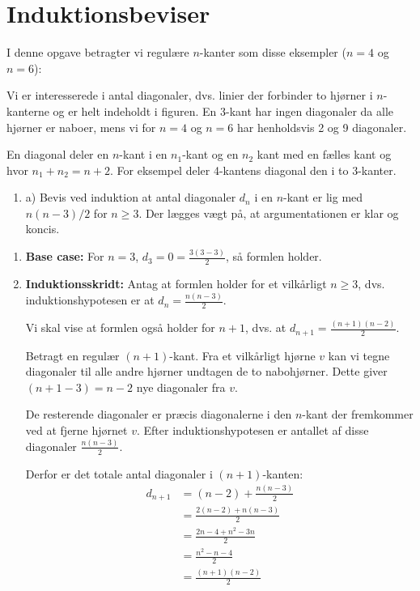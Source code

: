 \documentclass{article}
\theoremstyle{definition}
\begin{document}
\section{Induktionsbeviser}
I denne opgave betragter vi regulære $n$-kanter som disse eksempler ($n = 4$ og $n = 6$):

Vi er interesserede i antal diagonaler, dvs. linier der forbinder to hjørner i $n$-kanterne og er helt indeholdt i figuren. En 3-kant har ingen diagonaler da alle hjørner er naboer, mens vi for $n = 4$ og $n = 6$ har henholdsvis 2 og 9 diagonaler.

En diagonal deler en $n$-kant i en $n_1$-kant og en $n_2$ kant med en fælles kant og hvor $n_1 + n_2 = n + 2$. For eksempel deler 4-kantens diagonal den i to 3-kanter.

\begin{enumerate}
    \item a) Bevis ved induktion at antal diagonaler $d_n$ i en $n$-kant er lig med $n(n-3)/2$ for $n \geq 3$. Der lægges vægt på, at argumentationen er klar og koncis.
\end{enumerate}

\begin{enumerate}
    \item \textbf{Base case:} For $n=3$, $d_3 = 0 = \frac{3(3-3)}{2}$, så formlen holder.
    
    \item \textbf{Induktionsskridt:} Antag at formlen holder for et vilkårligt $n \geq 3$, dvs.
    induktionshypotesen er at $d_n = \frac{n(n-3)}{2}$.
    
    Vi skal vise at formlen også holder for $n+1$, dvs. at $d_{n+1} = \frac{(n+1)(n-2)}{2}$.
    
    Betragt en regulær $(n+1)$-kant. Fra et vilkårligt hjørne $v$ kan vi tegne diagonaler til alle
    andre hjørner undtagen de to nabohjørner. Dette giver $(n+1-3) = n-2$ nye diagonaler fra $v$.
    
    De resterende diagonaler er præcis diagonalerne i den $n$-kant der fremkommer ved at fjerne
    hjørnet $v$. Efter induktionshypotesen er antallet af disse diagonaler $\frac{n(n-3)}{2}$.
    
    Derfor er det totale antal diagonaler i $(n+1)$-kanten:
    \begin{align*}
        d_{n+1} &= (n-2) + \frac{n(n-3)}{2} \\
        &= \frac{2(n-2) + n(n-3)}{2} \\
        &= \frac{2n-4 + n^2-3n}{2} \\
        &= \frac{n^2-n-4}{2} \\
        &= \frac{(n+1)(n-2)}{2}
    \end{align*}
\end{enumerate}
\end{document}

